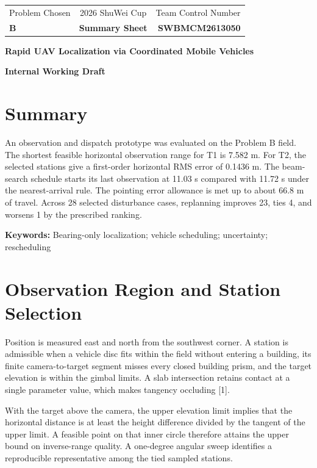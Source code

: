 \documentclass[12pt,a4paper]{article}
\newcommand{\ProblemLetter}{B}
\newcommand{\TeamNumber}{SWBMCM2613050}
\newcommand{\PaperTitle}{Rapid UAV Localization via Coordinated Mobile Vehicles}
\begin{document}
\pagestyle{fancy}
\thispagestyle{empty}
\begin{center}
\begin{tabular*}{\textwidth}{@{\extracolsep{\fill}}lcr@{}}
  \toprule
  Problem Chosen & 2026 ShuWei Cup & Team Control Number\\
  \textbf{\ProblemLetter} & \textbf{Summary Sheet} & \textbf{\TeamNumber}\\
  \bottomrule
\end{tabular*}

\vspace{1em}
{\Large\bfseries\PaperTitle}
\end{center}
\noindent\textbf{Internal Working Draft}

\section*{Summary}
An observation and dispatch prototype was evaluated on the Problem B field. The shortest feasible horizontal observation range for T1 is 7.582 m. For T2, the selected stations give a first-order horizontal RMS error of 0.1436 m. The beam-search schedule starts its last observation at 11.03 s compared with 11.72 s under the nearest-arrival rule. The pointing error allowance is met up to about 66.8 m of travel. Across 28 selected disturbance cases, replanning improves 23, ties 4, and worsens 1 by the prescribed ranking.

\noindent\textbf{Keywords:} Bearing-only localization; vehicle scheduling; uncertainty; rescheduling

\clearpage
\tableofcontents
\clearpage

\section{Observation Region and Station Selection}

Position is measured east and north from the southwest corner. A station is admissible when a vehicle disc fits within the field without entering a building, its finite camera-to-target segment misses every closed building prism, and the target elevation is within the gimbal limits. A slab intersection retains contact at a single parameter value, which makes tangency occluding [1].

With the target above the camera, the upper elevation limit implies that the horizontal distance is at least the height difference divided by the tangent of the upper limit. A feasible point on that inner circle therefore attains the upper bound on inverse-range quality. A one-degree angular sweep identifies a reproducible representative among the tied sampled stations.
\end{document}

